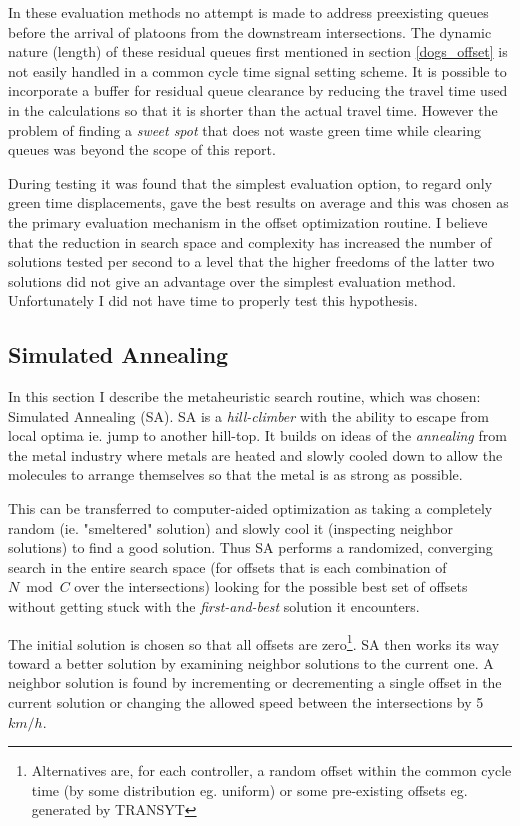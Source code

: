 In these evaluation methods no attempt is made to address preexisting queues before the arrival of platoons from the downstream intersections. The dynamic nature (length) of these residual queues first mentioned in section \ref{dogs_offset} is not easily handled in a common cycle time signal setting scheme. It is possible to incorporate a buffer for residual queue clearance by reducing the travel time used in the calculations so that it is shorter than the actual travel time. However the problem of finding a \textit{sweet spot} that does not waste green time while clearing queues was beyond the scope of this report.

During testing it was found that the simplest evaluation option, to regard only green time displacements, gave the best results on average and this was chosen as the primary evaluation mechanism in the offset optimization routine. I believe that the reduction in search space and complexity has increased the number of solutions tested per second to a level that the higher freedoms of the latter two solutions did not give an advantage over the simplest evaluation method. Unfortunately I did not have time to properly test this hypothesis.

\subsection{Simulated Annealing}
\label{siman}
In this section I describe the metaheuristic search routine, which was chosen: Simulated Annealing (SA). 
SA is a \textit{hill-climber} with the ability to escape from local optima ie. jump to another hill-top. It builds on ideas of the \textit{annealing} from the metal industry where metals are heated and slowly cooled down to allow the molecules to arrange themselves so that the metal is as strong as possible.

This can be transferred to computer-aided optimization as taking a completely random (ie. "smeltered" solution) and slowly cool it (inspecting neighbor solutions) to find a good solution. Thus SA performs a randomized, converging search in the entire search space (for offsets that is each combination of $N \bmod C$ over the intersections) looking for the possible best set of offsets without getting stuck with the \textit{first-and-best} solution it encounters.

The initial solution is chosen so that all offsets are zero\footnote{Alternatives are, for each controller, a random offset within the common cycle time (by some distribution eg. uniform) or some pre-existing offsets eg. generated by TRANSYT}. SA then works its way toward a better solution by examining neighbor solutions to the current one. A neighbor solution is found by incrementing or decrementing a single offset in the current solution or changing the allowed speed between the intersections by 5$km/h$.

